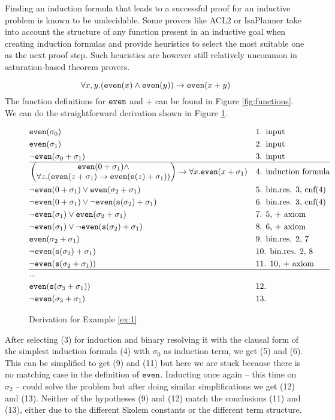 Finding an induction formula that leads to a successful proof for an inductive problem is known to be undecidable. Some provers like ACL2 or IsaPlanner take into account the structure of any function present in an inductive goal when creating induction formulas and provide heuristics to select the most suitable one as the next proof step. Such heuristics are however still relatively uncommon in saturation-based theorem provers.
\begin{example}\label{ex:1}
$$\forall x,y. (\mathtt{even}(x)\land \mathtt{even}(y))\rightarrow \mathtt{even}(x+y)$$
The function definitions for $\mathtt{even}$ and + can be found in Figure \ref{fig:functions}. We can do the straightforward derivation shown in Figure \ref{fig:1}.
\footnotesize
\begin{figure}\begin{mdframed}[usetwoside=false,innermargin=0pt]$$\begin{aligned}
&\mathtt{even}(\sigma_0)&&\text{1. input}\\
&\mathtt{even}(\sigma_1)&&\text{2. input}\\
&\neg\mathtt{even}(\sigma_0+\sigma_1)&&\text{3. input}\\
\hline
&\begin{pmatrix}\mathtt{even}(0+\sigma_1)\land\\\forall z.(\mathtt{even}(z+\sigma_1)\rightarrow\mathtt{even}(\mathtt{s}(z)+\sigma_1))\end{pmatrix}\rightarrow \forall x.\mathtt{even}(x+\sigma_1)&&\text{4. induction formula}\\
&\neg\mathtt{even}(0+\sigma_1)\lor \mathtt{even}(\sigma_2+\sigma_1)&&\text{5. bin.res. 3, cnf(4)}\\
&\neg\mathtt{even}(0+\sigma_1)\lor \neg\mathtt{even}(\mathtt{s}(\sigma_2)+\sigma_1)&&\text{6. bin.res. 3, cnf(4)}\\
&\neg\mathtt{even}(\sigma_1)\lor \mathtt{even}(\sigma_2+\sigma_1)&&\text{7. 5, + axiom}\\
&\neg\mathtt{even}(\sigma_1)\lor \neg\mathtt{even}(\mathtt{s}(\sigma_2)+\sigma_1)&&\text{8. 6, + axiom}\\
&\mathtt{even}(\sigma_2+\sigma_1)&&\text{9. bin.res. 2, 7}\\
&\neg\mathtt{even}(\mathtt{s}(\sigma_2)+\sigma_1)&&\text{10. bin.res. 2, 8}\\
&\neg\mathtt{even}(\mathtt{s}(\sigma_2+\sigma_1))&&\text{11. 10, + axiom}\\
\hline
&...\\
&\mathtt{even}(\mathtt{s}(\sigma_3+\sigma_1))&&\text{12.}\\
&\neg\mathtt{even}(\sigma_3+\sigma_1)&&\text{13.}
\end{aligned}$$\end{mdframed}
\caption{Derivation for Example \ref{ex:1}}
\label{fig:1}
\end{figure}
\normalsize
After selecting (3) for induction and binary resolving it with the clausal form of the simplest induction formula (4) with $\sigma_0$ as induction term, we get (5) and (6). This can be simplified to get (9) and (11) but here we are stuck because there is no matching case in the definition of $\mathtt{even}$. Inducting once again -- this time on $\sigma_2$ -- could solve the problem but after doing similar simplifications we get (12) and (13). Neither of the hypotheses (9) and (12) match the conclusions (11) and (13), either due to the different Skolem constants or the different term structure.


\end{example}
